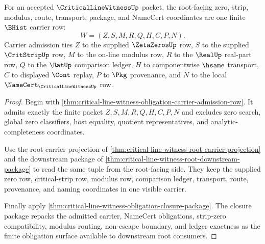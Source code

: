 \begin{theorem}
\label{thm:critical-line-witness-root-zero-strip-carrier-row}
For an accepted $\CriticalLineWitnessUp$ packet, the root-facing zero, strip, modulus, route, transport, package, and NameCert coordinates are one finite $\BHist$ carrier row:
$$
W=(Z,S,M,R,Q,H,C,P,N).
$$
Carrier admission ties $Z$ to the supplied $\ZetaZerosUp$ row, $S$ to the supplied $\CritStripUp$ row, $M$ to the on-line modulus row, $R$ to the $\RealUp$ real-part row, $Q$ to the $\RatUp$ comparison ledger, $H$ to componentwise $\hsame$ transport, $C$ to displayed $\Cont$ replay, $P$ to $\Pkg$ provenance, and $N$ to the local $\NameCert_{\CriticalLineWitnessUp}$ row.
\end{theorem}
\begin{proof}
Begin with \autoref{thm:critical-line-witness-obligation-carrier-admission-row}. It admits exactly the finite packet $Z,S,M,R,Q,H,C,P,N$ and excludes zero search, global zero classifiers, host equality, quotient representatives, and analytic-completeness coordinates.

Use the root carrier projection of \autoref{thm:critical-line-witness-root-carrier-projection} and the downstream package of \autoref{thm:critical-line-witness-root-downstream-package} to read the same tuple from the root-facing side. They keep the supplied zero row, critical-strip row, modulus row, comparison ledger, transport, route, provenance, and naming coordinates in one visible carrier.

Finally apply \autoref{thm:critical-line-witness-obligation-closure-package}. The closure package repacks the admitted carrier, NameCert obligations, strip-zero compatibility, modulus routing, non-escape boundary, and ledger exactness as the finite obligation surface available to downstream root consumers.
\end{proof}

